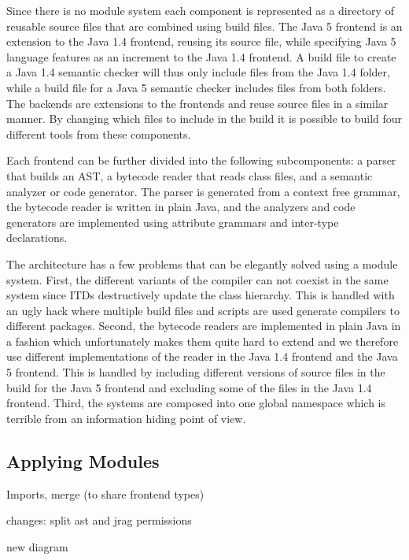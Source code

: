 Since there is no module system each component is represented as a
directory of reusable source files that are combined using build files. The
Java 5 frontend is an extension to the Java 1.4 frontend, reusing its
source file, while specifying Java 5 language features as an increment to
the Java 1.4 frontend. A build file to create a Java 1.4 semantic checker
will thus only include files from the Java 1.4 folder, while a build file
for a Java 5 semantic checker includes files from both folders. The
backends are extensions to the frontends and reuse source files in a
similar manner.  By changing which files to include in the build it is
possible to build four different tools from these components.

Each frontend can be further divided into the following subcomponents: a
parser that builds an AST, a bytecode reader that reads class files, and a
semantic analyzer or code generator. The parser is generated from a context
free grammar, the bytecode reader is written in plain Java, and the
analyzers and code generators are implemented using attribute grammars and
inter-type declarations.

The architecture has a few problems that can be elegantly solved using a
module system. First, the different variants of the compiler can not
coexist in the same system since ITDs destructively update the class
hierarchy. This is handled with an ugly hack where multiple build files and
scripts are used generate compilers to different packages.  Second, the
bytecode readers are implemented in plain Java in a fashion which
unfortunately makes them quite hard to extend and we therefore use
different implementations of the reader in the Java 1.4 frontend and the
Java 5 frontend. This is handled by including different versions of source
files in the build for the Java 5 frontend and excluding some of the files
in the Java 1.4 frontend. Third, the systems are composed into one global
namespace which is terrible from an information hiding point of view.

\subsection{Applying Modules}

Imports, merge (to share frontend types)

changes:
split ast and jrag
permissions

new diagram

